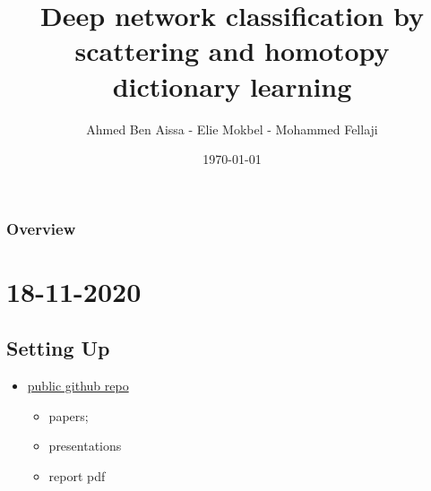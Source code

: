 \documentclass{beamer}
\title[Scattering]{Deep network classification by scattering and homotopy dictionary learning} %
\author{Ahmed Ben Aissa - Elie Mokbel - Mohammed Fellaji} %
\institute[CentraleSupélec] %
{
Ecole CentraleSupélec \\ %
\medskip

}
\date{\today} %
\begin{document}
\begin{frame}
\titlepage %
\end{frame}


\begin{frame}
\frametitle{Overview} %
\tableofcontents %
\end{frame}


\section{18-11-2020} 

\subsection{Setting Up} 

\begin{frame}
\begin{itemize}
	\item  \href{https://github.com/fellajimed/Deep-network-classification-by-scattering-and-homotopy-dictionary-learning}{public github repo}
	
	
	\begin{itemize}
    	\item papers;
    	\item presentations 
    	\item report pdf
    \end{itemize}

\end{itemize}
\end{frame}
\end{document}
